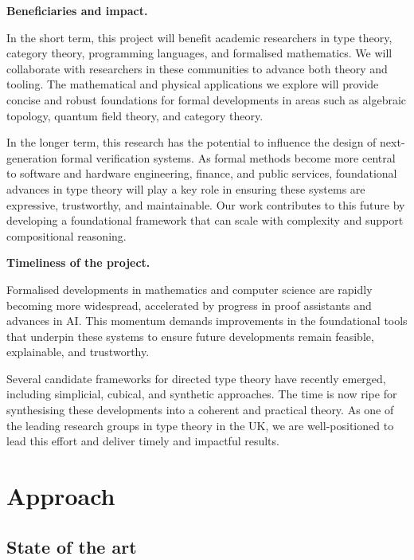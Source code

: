 \documentclass[a4paper,11pt]{article}
\renewcommand{\paragraph}[1]{\textbf{#1.}}
\begin{document}
\paragraph{Beneficiaries and impact}

In the short term, this project will benefit academic researchers in
type theory, category theory, programming languages, and formalised
mathematics. We will collaborate with researchers in these communities
to advance both theory and tooling. The mathematical and physical
applications we explore will provide concise and robust foundations
for formal developments in areas such as algebraic topology, quantum
field theory, and category theory.

In the longer term, this research has the potential to influence the
design of next-generation formal verification systems. As formal
methods become more central to software and hardware engineering,
finance, and public services, foundational advances in type theory
will play a key role in ensuring these systems are expressive,
trustworthy, and maintainable. Our work contributes to this future by
developing a foundational framework that can scale with complexity and
support compositional reasoning.

\paragraph{Timeliness of the project}

Formalised developments in mathematics and computer science are
rapidly becoming more widespread, accelerated by progress in proof
assistants and advances in AI. This momentum demands improvements in
the foundational tools that underpin these systems to ensure future
developments remain feasible, explainable, and trustworthy.

Several candidate frameworks for directed type theory have recently
emerged, including simplicial, cubical, and synthetic approaches. The
time is now ripe for synthesising these developments into a coherent
and practical theory. As one of the leading research groups in type
theory in the UK, we are well-positioned to lead this effort and
deliver timely and impactful results.

\section{Approach} %


\subsection{State of the art}\label{state-of-the-art}
\end{document}
